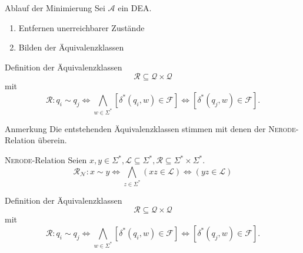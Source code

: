 \documentclass[]{beamer}
\begin{document}
\begin{frame}[squeeze]{}
  \begin{exampleblock}{Ablauf der Minimierung}
    Sei $\mathcal{A}$ ein DEA.
    \begin{enumerate}
      \item Entfernen unerreichbarer Zustände
      \item Bilden der Äquivalenzklassen
    \end{enumerate}
  \end{exampleblock}
  
  \pause
  
  \begin{block}{Definition der Äquivalenzklassen}
    \[\mathcal{R} \subseteq \mathcal{Q} \times \mathcal{Q}\]
    mit
    \[\mathcal{R} : q_i \sim q_j \Leftrightarrow \underset{w \in \Sigma^*}{\bigwedge} \left[ \delta^* \left( q_i, w \right) \in \mathcal{F} \right] \Leftrightarrow \left[ \delta^* \left( q_j, w \right) \in \mathcal{F} \right].\]
  \end{block}
  
  \pause
  
  \begin{block}{Anmerkung}
    Die entstehenden Äquivalenzklassen stimmen mit denen der \textsc{Nerode}-Relation überein.
  \end{block}
\end{frame}

\begin{frame}[squeeze]{}
  \begin{block}{\textsc{Nerode}-Relation}
    Seien $x, y \in \Sigma^*, \mathcal{L} \subseteq \Sigma^*, \mathcal{R} \subseteq \Sigma^* \times \Sigma^*$.
    \[\mathcal{R_N} : x \sim y \Leftrightarrow \underset{z \in \Sigma^*}{\bigwedge} (xz \in \mathcal{L}) \Leftrightarrow (yz \in \mathcal{L})\]
  \end{block}

  \begin{block}{Definition der Äquivalenzklassen}
    \[\mathcal{R} \subseteq \mathcal{Q} \times \mathcal{Q}\]
    mit
    \[\mathcal{R} : q_i \sim q_j \Leftrightarrow \underset{w \in \Sigma^*}{\bigwedge} \left[ \delta^* \left( q_i, w \right) \in \mathcal{F} \right] \Leftrightarrow \left[ \delta^* \left( q_j, w \right) \in \mathcal{F} \right].\]
  \end{block}  
\end{frame}
\end{document}
